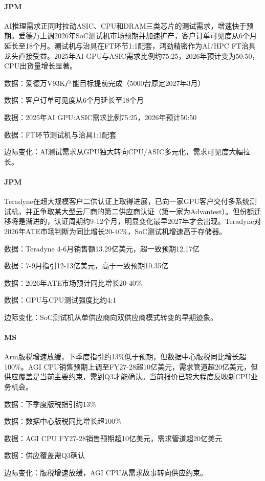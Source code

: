 \documentclass[11pt]{ctexart}
\begin{document}
\paragraph{JPM} AI推理需求正同时拉动ASIC、CPU和DRAM三类芯片的测试需求，增速快于预期。爱德万上调2026年SoC测试机市场预期并加速扩产，客户订单可见度从6个月延长至18个月。测试机与治具在FT环节1:1配套，鸿劲精密作为AI/HPC FT治具龙头直接受益。2025年AI GPU与ASIC需求比例约75:25，2026年预计变为50:50，CPU出货量增长显著。
{\small\color{refgray}数据：爱德万V93K产能目标提前完成（5000台原定2027年3月）\par}
{\small\color{refgray}数据：客户订单可见度从6个月延长至18个月\par}
{\small\color{refgray}数据：2025年AI GPU:ASIC需求比例75:25，2026年预计50:50\par}
{\small\color{refgray}数据：FT环节测试机与治具1:1配套\par}
{\small\color{refgray}边际变化：AI测试需求从GPU独大转向CPU/ASIC多元化，需求可见度大幅拉长。\par}
\paragraph{JPM} Teradyne在超大规模客户二供认证上取得进展，已向一家GPU客户交付多系统测试机，并正争取某大型云厂商的第二供应商认证（第一家为Advantest）。但份额迁移将是渐进的，认证周期约9-12个月，明显变化最早2027年才会出现。Teradyne对2026年ATE市场判断为同比增长20-40\%，SoC测试机增速高于存储器。
{\small\color{refgray}数据：Teradyne 4-6月销售额13.29亿美元，超一致预期12.17亿\par}
{\small\color{refgray}数据：7-9月指引12-13亿美元，高于一致预期10.35亿\par}
{\small\color{refgray}数据：2026年ATE市场预计同比增长20-40\%\par}
{\small\color{refgray}数据：GPU与CPU测试强度比约4:1\par}
{\small\color{refgray}边际变化：SoC测试机从单供应商向双供应商模式转变的早期迹象。\par}
\paragraph{MS} Arm版税增速放缓，下季度指引约13\%低于预期，但数据中心版税同比增长超100\%。AGI CPU销售预期上调至FY27-28超10亿美元，需求管道超20亿美元，但供应覆盖是当前主要约束，需到Q3才能确认。当前报价已较大程度反映新CPU业务机会。
{\small\color{refgray}数据：下季度版税指引约13\%\par}
{\small\color{refgray}数据：数据中心版税同比增长超100\%\par}
{\small\color{refgray}数据：AGI CPU FY27-28销售预期超10亿美元，需求管道超20亿美元\par}
{\small\color{refgray}数据：供应覆盖需Q3确认\par}
{\small\color{refgray}边际变化：版税增速放缓，AGI CPU从需求故事转向供应约束。\par}
\end{document}
